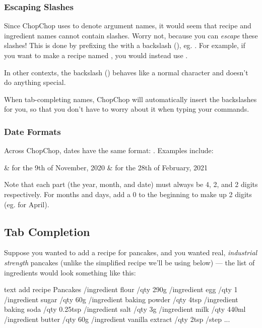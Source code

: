 	\pagebreak
	\subsubsection{Escaping Slashes}

		Since ChopChop uses \mono{/} to denote argument names, it would seem that recipe and ingredient names cannot contain slashes.
		Worry not, because you can \emph{escape} these slashes! This is done by prefixing the \mono{/} with a backslash
		(\mono{\textbackslash}), eg. \mono{\textbackslash/}. For example, if you want to make a recipe named ,
		you would instead use .

		In other contexts, the backslash (\mono{\textbackslash}) behaves like a normal character and doesn't do anything special.

		When tab-completing names, ChopChop will automatically insert the backslashes for you, so that you don't have to worry about
		it when typing your commands.


	\hypertarget{DateFormats}{}
	\subsubsection{Date Formats}

		Across ChopChop, dates have the same format: . Examples include:
		\begin{bulletlist}
			&  for the 9th of November, 2020
			&  for the 28th of February, 2021
		\end{bulletlist}

		Note that each part (the year, month, and date) must always be 4, 2, and 2 digits respectively. For months and days, add a 0 to the beginning to make up 2 digits (eg.  for April).


\hypertarget{TabCompletion}{}
\subsection{Tab Completion}

	Suppose you wanted to add a recipe for pancakes, and you wanted real, \emph{industrial strength} pancakes (unlike the
	simplified recipe we'll be using below) --- the list of ingredients would look something like this:

	\begin{blockofcode}{text}
	add recipe Pancakes
	  /ingredient flour /qty 290g
	  /ingredient egg /qty 1
	  /ingredient sugar /qty 60g
	  /ingredient baking powder /qty 4tsp
	  /ingredient baking soda /qty 0.25tsp
	  /ingredient salt /qty 3g
	  /ingredient milk /qty 440ml
	  /ingredient butter /qty 60g
	  /ingredient vanilla extract /qty 2tsp
	  /step ...
	\end{blockofcode}

